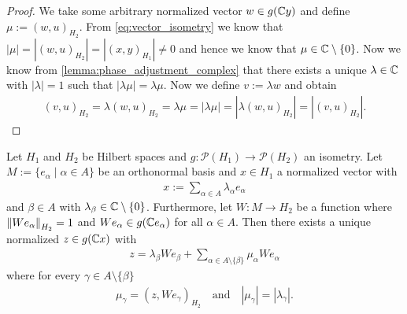 \begin{proof}
	We take some arbitrary normalized vector $w \in g(\C y)$ and define $\mu := (w, u)_{H_2}$. From \eqref{eq:vector_isometry} we know that $|\mu| = |(w,u)_{H_2}| = |(x,y)_{H_1}| \neq 0$ and hence we know that $\mu \in \C \setminus \{0\}$. Now we know from \ref{lemma:phase_adjustment_complex} that there exists a unique $\lambda \in \C$ with $|\lambda| = 1$ such that $|\lambda \mu| = \lambda \mu$. Now we define $v := \lambda w$ and obtain
	\begin{align*}
		(v,u)_{H_2} = \lambda (w,u)_{H_2} = \lambda \mu = |\lambda \mu| = |\lambda (w, u)_{H_2}| = |(v,u)_{H_2}|.
	\end{align*}
\end{proof}

\begin{lemma} \label{lemma:aux_main}
	Let $H_1$ and $H_2$ be Hilbert spaces and $g: \mathcal{P}(H_1) \to \mathcal{P}(H_2)$ an isometry. Let $M := \{e_\alpha \mid \alpha \in A\}$ be an orthonormal basis and $x \in H_1$ a normalized vector with
	\begin{align*}
		x :=\sum_{\alpha \in A} \lambda_\alpha e_\alpha
	\end{align*} 
	and $\beta \in A$ with $\lambda_\beta \in \C \setminus \{0\}$. Furthermore, let $W: M \to H_2$ be a function where $\norm[H_2]{We_\alpha} = 1$ and $We_\alpha \in g(\C e_\alpha)$ for all $\alpha \in A$. Then there exists a unique normalized $z \in g(\C x)$ with 
	\begin{align*}
		z = \lambda_\beta We_\beta + \sum_{\alpha \in A \setminus \{\beta\}} \mu_\alpha We_\alpha
	\end{align*}
	where for every $\gamma \in A \setminus \{\beta\}$
	\begin{align*}
		\mu_\gamma = (z, We_\gamma)_{H_2} \quad \text{and} \quad |\mu_\gamma| = |\lambda_\gamma|.
	\end{align*}
\end{lemma}

